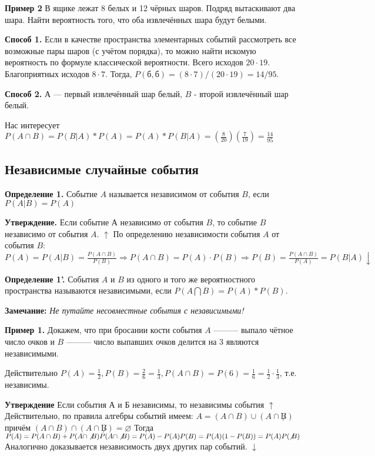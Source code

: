 \documentclass{article}
\begin{document}
\textbf{Пример 2}
В ящике лежат 8 белых и 12 чёрных шаров. Подряд вытаскивают два шара.
Найти вероятность того, что оба извлечённых шара будут белыми.

\textbf{Способ 1.} 
Если в качестве пространства элементарных событий рассмотреть все возможные пары шаров (с учётом порядка), то можно найти искомую вероятность по формуле классической вероятности.
Всего исходов \(20 \cdot 19\). Благоприятных исходов \(8 \cdot 7\). Тогда, \(P(б,б)=(8 \cdot 7)/(20 \cdot 19)=14/95\).

\textbf{Способ 2.}
$А$ — первый извлечённый шар белый, $B$ - второй извлечённый шар белый. 

Нас интересует \(P(A \cap B) = P(B|A)*P(A) = P(A)*P(B|A) = (\frac{8}{20})(\frac{7}{19}) = \frac{14}{95}\)

\subsection{Независимые случайные события}
\textbf{Определение 1.} Событие $A$ называется независимом от события $B$, если \(P(A|B) = P(A)\)

\textbf{Утверждение.} Если событие $А$ независимо от события $B$, то событие $B$ независимо от события $A$.
\( \uparrow \) По определению независимости события $A$ от события $B$:
\( P(A) = P(A|B) = \frac{P(A \cap B)}{P(B)} \Rightarrow P(A \cap B) = P(A) \cdot P(B) \Rightarrow P(B) = \frac{P(A \cap B)}{P(A)} = P(B|A) \downarrow\)

\textbf{Определение 1'.} События $A$ и $B$ из одного и того же вероятностного пространства называются независимыми, если \(P(A \bigcap B) = P(A)*P(B)\). 

\textbf{Замечание:} \textit{Не путайте несовместные события с независимыми!}

\textbf{Пример 1.} Докажем, что при бросании кости события $A$ ——— выпало чётное число очков и $B$ ——— число выпавших очков делится на 3 являются независимыми.

Действительно \(P(A) = \frac{1}{2}, P(B) = \frac{2}{6} = \frac{1}{3}, P(A \cap B) = P(6) = \frac{1}{6} = \frac{1}{2} \cdot \frac{1}{3}\), т.е. независимы. 

\textbf{Утверждение} Если события А и Б независимы, то независимы события %
\(\uparrow\) Действительно, по правила алгебры событий имеем:
\( A = (A \cap B) \cup (A \cap \not B)\) причём \( (A \cap B) \cap (A \cap \not B) = \varnothing\)
Тогда \( P(A) = P(A \cap B) + P(A \cap \not B) \\ P(A \cap \not B) = P(A) - P(A)P(B) = P(A)(1 - P(B)) = P(A)P(\not B)\)
Аналогично доказывается независимость двух других пар событий. \(\downarrow\)
\end{document}
